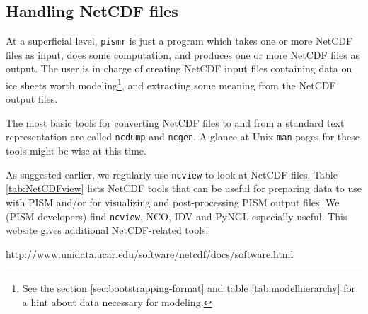 



\subsection{Handling NetCDF files}\label{subsect:nctoolsintro}  At a superficial level, \verb|pismr| is just a program which takes one or more NetCDF files as input, does some computation, and produces one or more NetCDF files as output.  The user is in charge of creating NetCDF input files containing data on ice sheets worth modeling\footnote{See the section \ref{sec:bootstrapping-format} and table \ref{tab:modelhierarchy} for a hint about data necessary for modeling.}, and extracting some meaning from the NetCDF output files.

The most basic tools for converting NetCDF files to and from a standard text representation are called \verb|ncdump| and \verb|ncgen|.  A glance at Unix \verb|man| pages for these tools might be wise at this time.

As suggested earlier, we regularly use \verb|ncview| to look at NetCDF files.  Table \ref{tab:NetCDFview} lists NetCDF tools that can be useful for preparing data to use with PISM and/or for visualizing and post-processing PISM output files. We (PISM developers) find \texttt{ncview}, NCO, IDV and PyNGL especially useful. This website gives additional NetCDF-related tools:

\centerline{ \url{http://www.unidata.ucar.edu/software/netcdf/docs/software.html} } 

